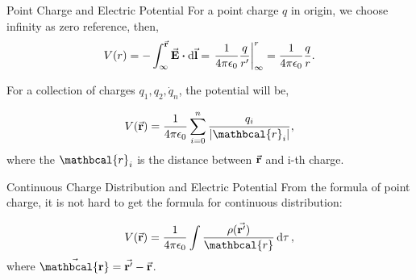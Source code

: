 \documentclass{beamer}
\begin{document}
\begin{frame}{Point Charge and Electric Potential}
    For a point charge $q$ in origin, we choose infinity as zero reference, then,
    \begin{equation}
        V(r) = -\int_{\infty}^{\va{r}} \va{E} \vdot \dd{\va{l}} = \eval{\frac{1}{4 \pi \epsilon_0} \frac{q}{r'}}_{\infty}^r = \frac{1}{4 \pi \epsilon_0} \frac{q}{r}.
    \end{equation}

    For a collection of charges $q_1, q_2, \dot q_n$, the potential will be,

    \begin{equation}
        V(\va{r}) = \frac{1}{4 \pi \epsilon_0} \sum_{i = 0}^{n} \frac{q_i}{\abs{\mathbcal{r}_i}},
    \end{equation}
    where the $\mathbcal{r}_i$ is the distance between $\va{r}$ and i-th charge.

\end{frame}

\begin{frame}{Continuous Charge Distribution and Electric Potential}
    From the formula of point charge, it is not hard to get the formula for continuous distribution:

    \begin{equation}
        V(\va{r}) = \frac{1}{4 \pi \epsilon_0} \int \frac{\rho(\va{r'})}{\mathbcal{r}} \dd{\tau},
    \end{equation}
    where $\va{\mathbcal{r}} = \va{r'} - \va{r}$.

\end{frame}
\end{document}
